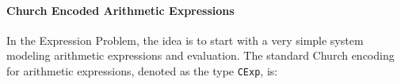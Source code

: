\begin{comment}
Oliveira and Cook~\cite{oliveira2012extensibility} proposed a design pattern that can solve the
Expression Problem in languages like Java. An advantage of the pattern
over previous solutions is that it is relatively lightweight in terms
of type system features. In a latter paper, Oliveira et al.~\cite{oliveira2013feature}
noted some limitations of the original design pattern and proposed 
some new techniques that generalized the original pattern, allowing it 
to express programs in a Feature-Oriented Programming~\cite{Prehofer97} style.
Key to these techniques was the ability to dynamically compose object
algebras.

Unfortunatelly, dynamic composition of object algebras is
non-trivial. At the type-level it is possible to express the resulting
type of the composition using intersection types. Thus, it is still
possible to solve that part problem nicely in a language like Scala (which
has basic support for intersection types). However, the dynamic
composition itself cannot be easily encoded in Scala. The fundamental 
issue is that Scala lacks a \lstinline{merge} operator (see the
discussion in Section~\ref{subsec:interScala}). Although both Oliveira et al.~\cite{oliveira2013feature} and
Rendell et al.~\cite{rendel14attributes} have shown that such a \lstinline{merge} operator can
be encoded in Scala, the encoding fundamentally relies in low-level
programming techniques such as dynamic proxies, reflection or
meta-programming. 

Because \name supports a \lstinline{merge} operator natively, dynamic
object algebra composition becomes easy to encode. The remainder of
this section shows how object algebras and object algebra composition
can be encoded in \name. We will illustrate this point 
step-by-step by solving the Expression Problem. 
\end{comment}
 

\paragraph{Church Encoded Arithmetic Expressions}
In the Expression Problem, the idea is to start with a very simple
system modeling arithmetic expressions and evaluation.
The standard Church encoding for arithmetic expressions, 
denoted as the type \lstinline{CExp}, is:

